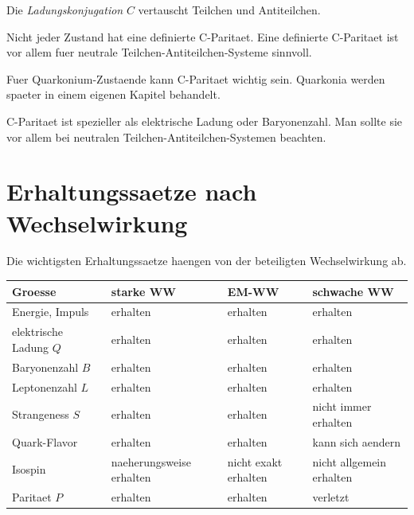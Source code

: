 \begin{definitionbox}
Die \emph{Ladungskonjugation} $C$ vertauscht Teilchen und Antiteilchen.
\end{definitionbox}

\begin{conceptbox}
Nicht jeder Zustand hat eine definierte C-Paritaet.
Eine definierte C-Paritaet ist vor allem fuer neutrale Teilchen-Antiteilchen-Systeme
sinnvoll.
\end{conceptbox}

\begin{notebox}
Fuer Quarkonium-Zustaende kann C-Paritaet wichtig sein.
Quarkonia werden spaeter in einem eigenen Kapitel behandelt.
\end{notebox}

\begin{examtipbox}
C-Paritaet ist spezieller als elektrische Ladung oder Baryonenzahl.
Man sollte sie vor allem bei neutralen Teilchen-Antiteilchen-Systemen beachten.
\end{examtipbox}

\section{Erhaltungssaetze nach Wechselwirkung}

Die wichtigsten Erhaltungssaetze haengen von der beteiligten Wechselwirkung ab.

\begin{center}
\begin{tabular}{|p{4.2cm}|p{3.2cm}|p{3.2cm}|p{3.2cm}|}
\hline
Groesse & starke WW & EM-WW & schwache WW \\
\hline
Energie, Impuls & erhalten & erhalten & erhalten \\
\hline
elektrische Ladung $Q$ & erhalten & erhalten & erhalten \\
\hline
Baryonenzahl $B$ & erhalten & erhalten & erhalten \\
\hline
Leptonenzahl $L$ & erhalten & erhalten & erhalten \\
\hline
Strangeness $S$ & erhalten & erhalten & nicht immer erhalten \\
\hline
Quark-Flavor & erhalten & erhalten & kann sich aendern \\
\hline
Isospin & naeherungsweise erhalten & nicht exakt erhalten & nicht allgemein erhalten \\
\hline
Paritaet $P$ & erhalten & erhalten & verletzt \\
\hline
\end{tabular}
\end{center}

